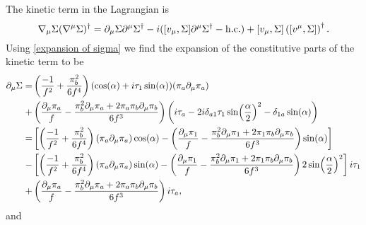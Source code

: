 \documentclass{article}
\begin{document}
The kinetic term in the \chpt Lagrangian is
\begin{equation}
    \nabla_\mu \Sigma (\nabla^\mu \Sigma)^\dagger 
    = \partial_\mu \Sigma \partial^\mu \Sigma^\dagger 
    - i([v_\mu, \Sigma] \partial^\mu \Sigma^\dagger - \mathrm{h.c.}) 
    + [v_\mu, \Sigma]\left([v^\mu, \Sigma]\right)^\dagger.
    \label{kinetic term}
\end{equation}
Using \autoref{expansion of sigma} we find the expansion of the constitutive parts of the kinetic term to be
\begin{align}
    \notag
    \partial_\mu \Sigma = &
    \left(
        \frac{-1}{f^2}
        + \frac{\pi_b^2}{6f^4}
    \right)
    (\cos(\alpha) + i \tau_1 \sin(\alpha)) (\pi_a \partial_\mu \pi_a)\\
    +&
    \left(
        \frac{\partial_\mu \pi_a}{f} 
        - \frac{\pi_b^2 \partial_\mu\pi_a 
        + 2 \pi_a \pi_b \partial_\mu\pi_b}{6f^3} 
    \right)
    \left(
        i\tau_a - 2i \delta_{a1}\tau_1\sin(\frac{\alpha}{2})^2 - \delta_{1a} \sin(\alpha)
    \right)
    \label{Sigma derivative}\\ \notag
    =& 
    \left[
        \left(
            \frac{-1}{f^2}
            + \frac{\pi_b^2}{6f^4}
        \right)
        (\pi_a \partial_\mu \pi_a)
        \cos(\alpha)
        - 
        \left(
            \frac{\partial_\mu \pi_1}{f} 
            - \frac{\pi_b^2 \partial_\mu\pi_1
            + 2 \pi_1 \pi_b \partial_\mu\pi_b}{6f^3} 
        \right)
        \sin(\alpha)
    \right]
    \\ \notag 
    - &
    \left[
        \left(
            \frac{-1}{f^2}
            + \frac{\pi_b^2}{6f^4}
        \right)
        (\pi_a \partial_\mu \pi_a)
        \sin(\alpha)
        - \left(
        \frac{\partial_\mu \pi_1}{f} 
        - \frac{\pi_b^2 \partial_\mu\pi_1
        + 2 \pi_1 \pi_b \partial_\mu\pi_b}{6f^3}
        \right)
        2 \sin(\frac{\alpha}{2})^2
    \right]
    i \tau_1 \\ \notag
    +& 
    \left(
        \frac{\partial_\mu \pi_a}{f} 
        - \frac{\pi_b^2 \partial_\mu\pi_a 
        + 2 \pi_a \pi_b \partial_\mu\pi_b}{6f^3} 
    \right)
    i \tau_a,
\end{align}
and
\end{document}
